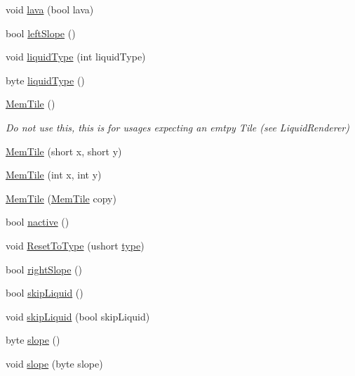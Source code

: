 \begin{DoxyCompactItemize}
void \hyperlink{classOTA_1_1Memory_1_1MemTile_a27473e21b271f4b34a6df10389dd3833}{lava} (bool lava)
\item 
bool \hyperlink{classOTA_1_1Memory_1_1MemTile_a427a8577fbe604035b21a7142e5c3230}{left\+Slope} ()
\item 
void \hyperlink{classOTA_1_1Memory_1_1MemTile_ae49f69ce3ba568d685bb5f030c106a6c}{liquid\+Type} (int liquid\+Type)
\item 
byte \hyperlink{classOTA_1_1Memory_1_1MemTile_ade7c092b59325ff083bee4f639a3caa9}{liquid\+Type} ()
\item 
\hyperlink{classOTA_1_1Memory_1_1MemTile_ad4a8d944ad3599a73ee1df69eb3a75b0}{Mem\+Tile} ()
\begin{DoxyCompactList}\small\item\em Do not use this, this is for usages expecting an emtpy Tile (see Liquid\+Renderer) \end{DoxyCompactList}\item 
\hyperlink{classOTA_1_1Memory_1_1MemTile_a55188ba2bd4c8cf3d0f188b4b5d76fb1}{Mem\+Tile} (short x, short y)
\item 
\hyperlink{classOTA_1_1Memory_1_1MemTile_a0d58cb997e28e475bf5de900dac7a66d}{Mem\+Tile} (int x, int y)
\item 
\hyperlink{classOTA_1_1Memory_1_1MemTile_a55c047db36ccaec6011febdc6a78d60e}{Mem\+Tile} (\hyperlink{classOTA_1_1Memory_1_1MemTile}{Mem\+Tile} copy)
\item 
bool \hyperlink{classOTA_1_1Memory_1_1MemTile_a1371663c90d3954e541f697010852c13}{nactive} ()
\item 
void \hyperlink{classOTA_1_1Memory_1_1MemTile_ae8eb4f20454d56a25423b68c051c5086}{Reset\+To\+Type} (ushort \hyperlink{classOTA_1_1Memory_1_1MemTile_afa7787a68eb26fb33dc369c00db629ca}{type})
\item 
bool \hyperlink{classOTA_1_1Memory_1_1MemTile_a425db04289b19b6d555ab551cdbe422d}{right\+Slope} ()
\item 
bool \hyperlink{classOTA_1_1Memory_1_1MemTile_a34964b577a483812e52e9650895b742b}{skip\+Liquid} ()
\item 
void \hyperlink{classOTA_1_1Memory_1_1MemTile_af25627ce8aa55ee95875029a53c9f01f}{skip\+Liquid} (bool skip\+Liquid)
\item 
byte \hyperlink{classOTA_1_1Memory_1_1MemTile_a062bccd7dec2bb0b414c9ced0d73f7eb}{slope} ()
\item 
void \hyperlink{classOTA_1_1Memory_1_1MemTile_a8e7f577eade3434b14a19d451de2ebcc}{slope} (byte slope)
\item 

\end{DoxyCompactItemize}
